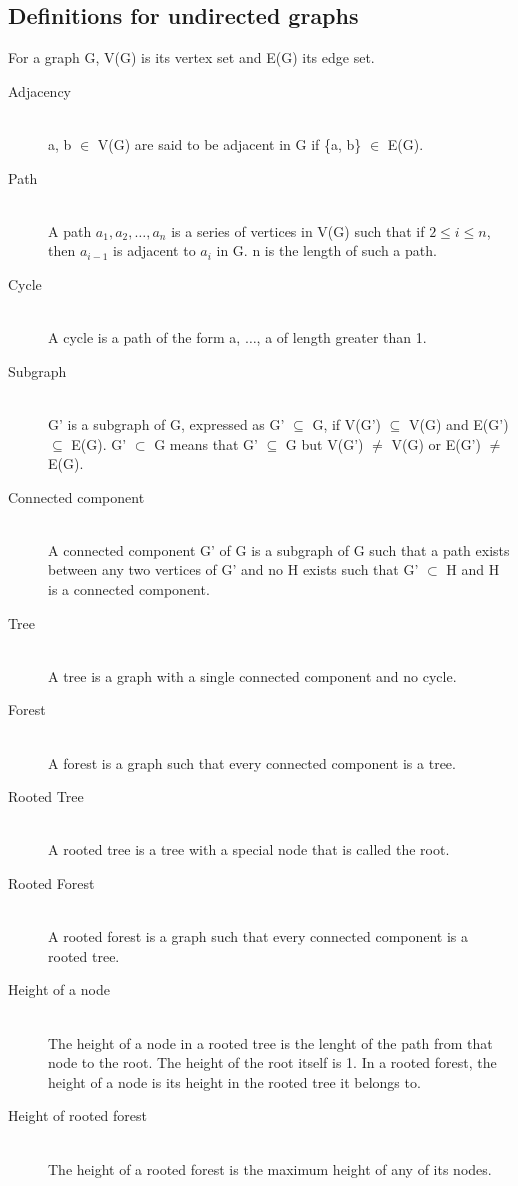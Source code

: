 \subsection{Definitions for undirected graphs}
For a graph G, V(G) is its vertex set and E(G) its edge set.
\begin{description}
 \item[Adjacency] \hfill \\
  a, b $\in$ V(G) are said to be adjacent in G if \{a, b\} $\in$ E(G).
 \item[Path] \hfill \\
  A path $a_1, a_2, \ldots, a_n$ is a series of vertices in V(G) such that if $2 \leq i \leq n$, then $a_{i-1}$ is adjacent to $a_i$ in G. n is the length of such a path.
 \item[Cycle] \hfill \\
  A cycle is a path of the form a, $\ldots$, a of length greater than 1.
 \item[Subgraph] \hfill \\
 G' is a subgraph of G, expressed as G' $\subseteq$ G, if V(G') $\subseteq$ V(G) and E(G') $\subseteq$ E(G). G' $\subset$ G means that G' $\subseteq$ G but V(G') $\neq$ V(G) or E(G') $\neq$ E(G).
 \item[Connected component] \hfill \\
  A connected component G' of G is a subgraph of G such that a path exists between any two vertices of G' and no H exists such that G' $\subset$ H and H is a connected component.
  \item[Tree] \hfill \\ 
  A tree is a graph with a single connected component and no cycle.
  \item[Forest] \hfill \\
  A forest is a graph such that every connected component is a tree.
  \item[Rooted Tree] \hfill \\ 
  A rooted tree is a tree with a special node that is called the root.
  \item[Rooted Forest] \hfill \\ 
  A rooted forest is a graph such that every connected component is a rooted tree.
  \item[Height of a node] \hfill \\ 
  The height of a node in a rooted tree is the lenght of the path from that node to the root. The height of the root itself is 1. In a rooted forest, the height of a node is its height in the rooted tree it belongs to.
  \item[Height of rooted forest] \hfill \\ 
  The height of a rooted forest is the maximum height of any of its nodes.
\end{description}

